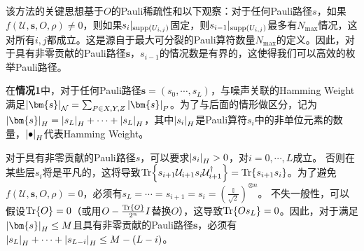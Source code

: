 该方法的关键思想基于$O$的Pauli稀疏性和以下观察：对于任何Pauli路径$s$，如果$f(\mathcal{U},\bm{s},O,\rho)\neq 0$，则如果$s_{i}|_{\text{supp}(U_{i,j})}$固定，则$s_{i-1}|_{\text{supp}(U_{i,j})}$最多有$N_{\text{max}}$情况，这对所有$i,j$都成立。这是源自于最大可分裂的Pauli算符数量$N_{\text{max}}$的定义。因此，对于具有非零贡献的Pauli路径$\bm{s}$，$s_{i-1}$的情况数是有界的，这使得我们可以高效的枚举Pauli路径。



在\textbf{情况1}中，对于任何Pauli路径$\bm{s}=(s_0,\cdots,s_L)$，与噪声关联的Hamming Weight 满足$\abs{\bm{s}}_{\mathcal{N}}=\sum_{P\in {X,Y,Z}}\abs{\bm{s}}_P$。为了与后面的情形做区分，记为$\abs{\bm{s}}_H=\abs{s_L}_H+\cdots+\abs{s_L}_H$，其中$\abs{s_i}_H$是Pauli算符$s_i$中的非单位元素的数量，$\abs{\bullet}_H$代表Hamming Weight。

对于具有非零贡献的Pauli路径$s$，可以要求$\abs{s_i}_H > 0$，对$i=0,\cdots,L$成立。
否则在某些层$s_i$将是平凡的，这将导致$\Tr{s_{i+1} \mathcal{U}_{i+1} s_i \mathcal{U}_{i+1}^\dagger}=\Tr{s_{i+1} s_i}$。为了避免$f(\mathcal{U},\bm{s},O,\rho)=0$，必须有$s_L=\cdots=s_{i+1}=s_i=\left(\frac{\mathbb{I}}{\sqrt{2}}\right)^{\otimes n}$。
不失一般性，可以假设$\Tr{O}=0$（或用$O-\frac{\Tr{O}}{2^n} I$替换$O$），这导致$\Tr{O s_L}=0$。因此，对于满足$\abs{\bm{s}}_H\leq M$且具有非零贡献的Pauli路径$\bm{s}$，必须有$\abs{s_{L}}_H+\cdots+\abs{s_{L-i}}_H\leq M-(L-i)$。


